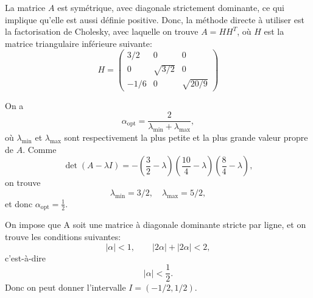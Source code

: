 \documentclass[11pt]{article}
\begin{document}
\newpage

\begin{Answer}[ref={ex:3}]
\ExePart
\Question
La matrice $A$ est sym\'etrique, avec diagonale strictement dominante, ce qui implique qu'elle est aussi
d\'efinie positive. Donc, la m\'ethode directe \`a utiliser est
la factorisation de Cholesky, avec laquelle on trouve $A = H H^T$,
o\`u $H$ est la matrice triangulaire inf\'erieure suivante:
$$
H =
\begin{pmatrix}
3/2   &     0      & 0 \\
 0    & \sqrt{3/2} & 0 \\
- 1/6 &     0      & \sqrt{20/9}
\end{pmatrix}
$$

\Question
On a
$$
\alpha_{\text{opt}} = \frac{2}{\lambda_{\text{min}} + \lambda_{\text{max}}},
$$
o\`u $\lambda_{\text{min}}$ et $\lambda_{\text{max}}$ sont respectivement
la plus petite et la plus grande valeur propre de $A$.
Comme
$$
\det (A - \lambda I) = - \left( \frac{3}{2} - \lambda \right)
\left( \frac{10}{4} - \lambda \right) \left( \frac{8}{4} - \lambda \right),
$$
on trouve
$$
\lambda_{\text{min}} = 3/2, \quad \lambda_{\text{max}} = 5/2,
$$
et donc $\alpha_{\text{opt}} = \frac{1}{2}$.



\ExePart

\Question
On impose que A soit une matrice \`a diagonale dominante stricte
par ligne, et on trouve les conditions suivantes:
$$
|\alpha| <1, \qquad |2\alpha| + |2\alpha| < 2,
$$
c'est-\`a-dire
$$
|\alpha| < \frac{1}{2}.
$$
Donc on peut donner l'intervalle $I = (-1/2, 1/2)$.


\end{Answer}
\end{document}
